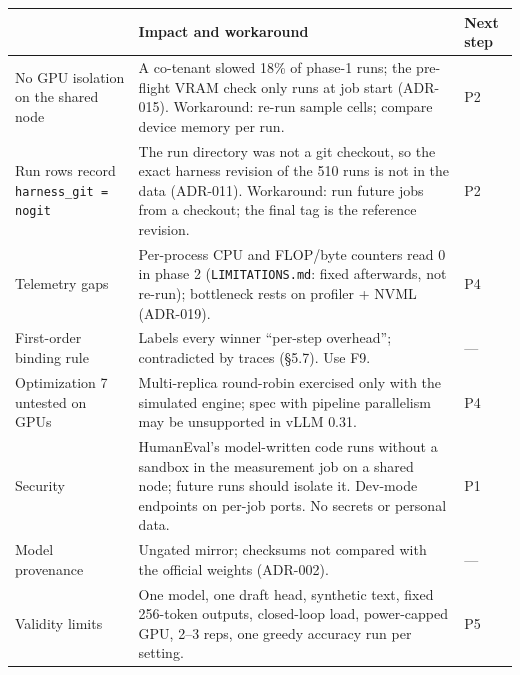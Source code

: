 \documentclass[10pt,a4paper]{article}
\newcommand{\hc}[1]{{\leavevmode\bfseries\color{ink}#1}}   %
\newcommand{\fp}[1]{{\leavevmode\urlstyle{tt}\color{codecol}\nolinkurl{#1}}}
\begin{document}
\begin{table}[H]
\small
\begin{tabularx}{\linewidth}{@{}P{3.7cm}LP{1.3cm}@{}}
\toprule
\rowcolor{tblhead}\hc{Known defect / risk} & \hc{Impact and workaround} & \hc{Next step} \\
\midrule
No GPU isolation on the shared node & A co-tenant slowed 18\% of phase-1 runs; the pre-flight VRAM check only runs at
job start (ADR-015). Workaround: re-run sample cells; compare device memory per run. & P2 \\
 Run rows record \texttt{harness\_git = nogit} & The run directory was not a git checkout, so the
exact harness revision of the 510 runs is not in the data (ADR-011). Workaround: run future jobs from a checkout; the
final tag is the reference revision. & P2 \\
Telemetry gaps & Per-process CPU and FLOP/byte counters read 0 in phase 2 (\fp{LIMITATIONS.md}: fixed afterwards,
not re-run); bottleneck rests on profiler + NVML (ADR-019). & P4 \\
 First-order binding rule & Labels every winner ``per-step overhead''; contradicted by traces (\S5.7). Use F9. & --- \\
Optimization 7 untested on GPUs & Multi-replica round-robin exercised only with the simulated
engine; spec with pipeline parallelism may be unsupported in vLLM 0.31. & P4 \\
 Security & HumanEval's model-written code runs without a sandbox
in the measurement job on a shared node; future runs should isolate it. Dev-mode endpoints on per-job ports. No secrets or personal data. & P1 \\
Model provenance & Ungated mirror; checksums not compared with the official weights (ADR-002). &
--- \\
Validity limits & One model, one draft head, synthetic text, fixed 256-token outputs, closed-loop load, power-capped
GPU, 2--3 reps, one greedy accuracy run per setting. & P5 \\
\bottomrule
\end{tabularx}
\end{table}

\end{document}
